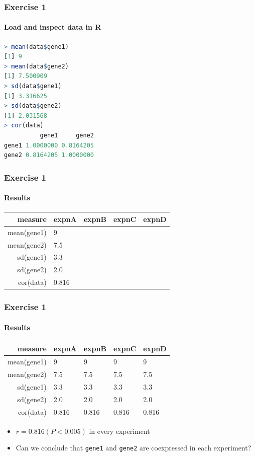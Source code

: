 \documentclass[table]{beamer}
\begin{document}
  \begin{frame}[fragile]
    \frametitle{Exercise 1}
    \framesubtitle{Load and inspect data in R}
    \begin{lstlisting}[language=R]
> mean(data$gene1)
[1] 9
> mean(data$gene2)
[1] 7.500909
> sd(data$gene1)
[1] 3.316625
> sd(data$gene2)
[1] 2.031568
> cor(data)
          gene1     gene2
gene1 1.0000000 0.8164205
gene2 0.8164205 1.0000000
    \end{lstlisting}
\end{frame}

  \begin{frame}
    \frametitle{Exercise 1}
    \framesubtitle{Results}
    \begin{center}
	\begin{tabular}{r|l|l|l|l}
	  measure & expnA & expnB & expnC & expnD \\
	  \hline
	  mean(gene1) & 9     &  &  & \\
	  mean(gene2) & 7.5   &  &  & \\
  	  sd(gene1)   & 3.3   &  &  & \\
  	  sd(gene2)   & 2.0   &  &  & \\  
	  cor(data)   & 0.816 &  &  & \\  
	\end{tabular}
    \end{center}
  \end{frame}

  \begin{frame}
    \frametitle{Exercise 1}
    \framesubtitle{Results}
    \begin{center}
	\begin{tabular}{r|l|l|l|l}
	  measure & expnA & expnB & expnC & expnD \\
	  \hline
	  mean(gene1) & 9     & 9     & 9     & 9 \\
	  mean(gene2) & 7.5   & 7.5   & 7.5   & 7.5 \\
  	  sd(gene1)   & 3.3   & 3.3   & 3.3   & 3.3 \\
  	  sd(gene2)   & 2.0   & 2.0   & 2.0   & 2.0 \\  
	  cor(data)   & 0.816 & 0.816 & 0.816 & 0.816 \\  
	\end{tabular}
	\end{center}
	\begin{itemize}
      \item<2-> $r=0.816 (P<0.005)$ in every experiment
      \item<2-> Can we conclude that \texttt{gene1} and \texttt{gene2} are coexpressed in each experiment?
    \end{itemize}
  \end{frame}
\end{document}
